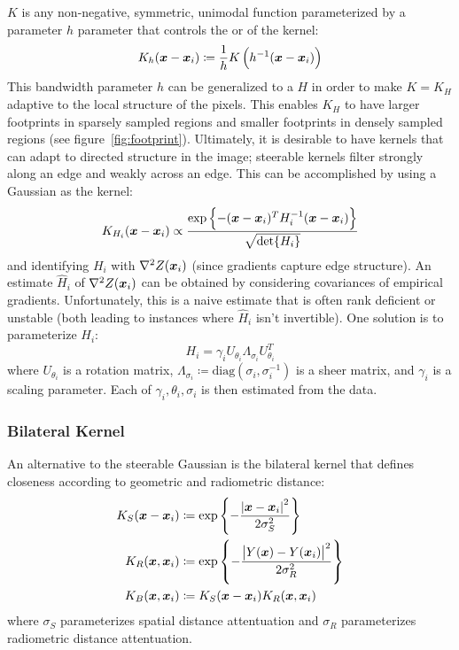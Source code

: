 \(K\) is any non-negative, symmetric, unimodal \cite{wand1994kernel} function parameterized by a parameter \(h\) parameter that controls the  or  of the kernel:
\begin{equation}
    K_h(\bm{x} - \bm{x}_i) \coloneqq \frac{1}{h}K\left( h^{-1}(\bm{x} - \bm{x}_i) \right)
\end{equation}
This bandwidth parameter \(h\) can be generalized to a  \(H\) in order to make \(K = K_H\) adaptive to the local structure of the pixels.
%
This enables \(K_H\) to have larger footprints in sparsely sampled regions and smaller footprints in densely sampled regions (see figure~\ref{fig:footprint}).
%
Ultimately, it is desirable to have kernels that can adapt to directed structure in the image; steerable kernels filter strongly along an edge and weakly across an edge.
%
This can be accomplished by using a Gaussian as the kernel:
\begin{equation}
    K_{H_i}(\bm{x} - \bm{x}_i) \propto \frac{\exp\left\{ -(\bm{x} - \bm{x}_i)^T H^{-1}_i (\bm{x} - \bm{x}_i) \right\}}{\sqrt{\det{H_i}}}
\end{equation}
and identifying \(H_i\) with \(\nabla^2 Z(\bm{x}_i)\) (since gradients capture edge structure).
%
An estimate \(\hat{H}_i\) of \(\nabla^2 Z(\bm{x}_i)\) can be obtained by considering covariances of empirical gradients.
%
Unfortunately, this is a naive estimate that is often rank deficient or unstable (both leading to instances where \(\hat{H}_i\) isn't invertible).
%
One solution is to parameterize \(H_i\):
\[
    H_i = \gamma_i U_{\theta_i} \Lambda_{\sigma_i} U_{\theta_i}^T
\]
where \(U_{\theta_i}\) is a rotation matrix, \(\Lambda_{\sigma_i} \coloneqq \text{diag}\left( \sigma_i, \sigma_i^{-1} \right)\) is a sheer matrix, and \(\gamma_i\) is a scaling parameter.
%
Each of \(\gamma_i, \theta_i, \sigma_i\) is then estimated from the data.
%
\subsubsection{Bilateral Kernel}

An alternative to the steerable Gaussian is the bilateral kernel \cite{Tomasi:1998:BFG:938978.939190} that defines closeness according to geometric and radiometric distance:
\begin{equation}
    \begin{split}
        K_S(\bm{x} - \bm{x}_i) &\coloneqq \exp \left\{ -\frac{\abs{ \bm{x} - \bm{x}_i }^2}{2 \sigma_S^2}  \right\} \\
        K_R(\bm{x}, \bm{x}_i) &\coloneqq \exp \left\{ -  \frac{\abs{ Y(\bm{x}) - Y(\bm{x}_i) }^2}{2 \sigma_R^2} \right\} \\
        K_B(\bm{x}, \bm{x}_i) &\coloneqq K_S(\bm{x} - \bm{x}_i)K_R(\bm{x}, \bm{x}_i)
    \end{split}
    \label{eqn:bilateralkernel}
\end{equation}
where \(\sigma_S\) parameterizes spatial distance attentuation and \(\sigma_R\) parameterizes radiometric distance attentuation.

